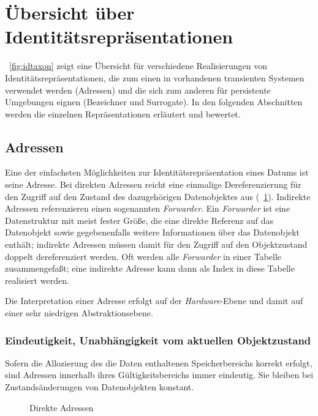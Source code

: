 \section{\"{U}bersicht \"{u}ber Identit\"{a}tsrepr\"{a}sentationen}%
\label{sec:ovidrepr}
%
\figurename~\ref{fig:idtaxon} %
%
zeigt eine \"{U}bersicht f\"{u}r verschiedene Realisierungen von
Iden\-ti\-t\"{a}ts\-re\-pr\"{a}\-sen\-ta\-tio\-nen, die zum einen in
vorhandenen transienten Systemen verwendet werden (Adressen) und die
sich zum anderen f\"{u}r persistente Umgebungen eignen (Bezeichner und
Surrogate). In den folgenden Abschnitten werden die einzelnen
Repr\"{a}sentationen erl\"{a}utert und bewertet.
%
\subsection{Adressen}
%
Eine der einfachsten M\"{o}glichkeiten zur Identit\"{a}tsrepr\"{a}sentation
eines Datums ist seine Adresse. Bei direkten Adressen reicht eine
einmalige Dereferenzierung f\"{u}r den Zugriff auf den Zustand des
dazugeh\"{o}rigen Datenobjektes aus (\figurename~\ref{fig:dadr}). %
Indirekte Adressen referenzieren einen sogenannten
{\em Forwarder}. Ein {\em Forwarder\/} ist eine Datenstruktur mit
meist fester Gr\"{o}\ss{}e, die eine direkte Referenz auf das Datenobjekt
sowie gegebenenfalls weitere Informationen \"{u}ber das Datenobjekt
enth\"{a}lt; indirekte Adressen m\"{u}ssen damit f\"{u}r den Zugriff auf den
Objektzustand doppelt dereferenziert werden.  Oft werden alle
{\em Forwarder\/} in einer Tabelle zusammengefa\ss{}t; eine indirekte
Adresse kann dann als Index in diese Tabelle realisiert werden.
%
\par{}Die Interpretation einer Adresse erfolgt auf der {\em
Hardware\/}-Ebene und damit auf einer sehr niedrigen
Abstraktionsebene.
%
\subsubsection{Eindeutigkeit, Unabh\"{a}ngigkeit vom aktuellen
Objektzustand}
%
Sofern die Allozierung des die Daten enthaltenen Speicherbereichs
korrekt erfolgt, sind Adressen innerhalb ihres G\"{u}ltigkeitsbereichs
immer eindeutig. Sie bleiben bei Zustands\"{a}nderungen von Datenobjekten
konstant.
%
\begin{figure}[htbp]%
\ifbuch%
\centerline{}%
\else%
\centerline{}%
\fi%
\caption{Direkte Adressen}\label{fig:dadr}%
\end{figure}%
%

